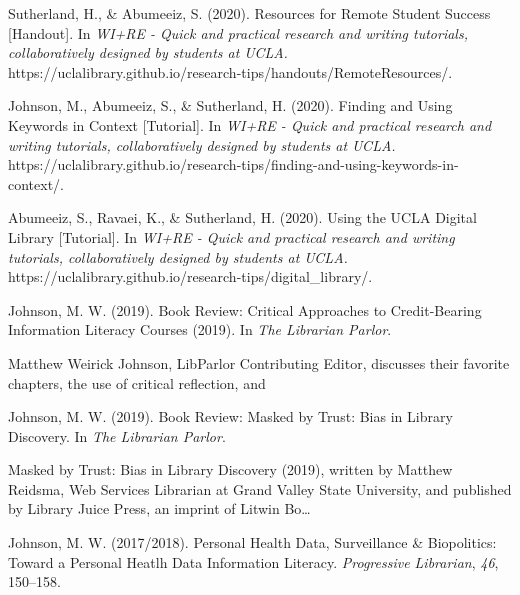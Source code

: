 \documentclass[
  letterpaper,
  DIV=11,
  numbers=noendperiod]{scrartcl}
\newlength{\cslhangindent}
\newenvironment{CSLReferences}[2] %
 {\begin{list}{}{%
  \setlength{\itemindent}{0pt}
  \setlength{\leftmargin}{0pt}
  \setlength{\parsep}{0pt}
  \ifodd #1
   \setlength{\leftmargin}{\cslhangindent}
   \setlength{\itemindent}{-1\cslhangindent}
  \fi
  \setlength{\itemsep}{#2\baselineskip}}}
 {\end{list}}
\newcommand{\CSLBlock}[1]{\hfill\break\parbox[t]{\linewidth}{\strut\ignorespaces#1\strut}}
\begin{document}
\begin{CSLReferences}{1}{0}
Sutherland, H., \& Abumeeiz, S. (2020). Resources for {Remote Student
Success} {[}Handout{]}. In \emph{WI+RE - Quick and practical research
and writing tutorials, collaboratively designed by students at UCLA.}
https://uclalibrary.github.io/research-tips/handouts/RemoteResources/.

Johnson, M., Abumeeiz, S., \& Sutherland, H. (2020). Finding and {Using
Keywords} in {Context} {[}Tutorial{]}. In \emph{WI+RE - Quick and
practical research and writing tutorials, collaboratively designed by
students at UCLA.}
https://uclalibrary.github.io/research-tips/finding-and-using-keywords-in-context/.

Abumeeiz, S., Ravaei, K., \& Sutherland, H. (2020). Using the {UCLA
Digital Library} {[}Tutorial{]}. In \emph{WI+RE - Quick and practical
research and writing tutorials, collaboratively designed by students at
UCLA.} https://uclalibrary.github.io/research-tips/digital\_library/.

Johnson, M. W. (2019). Book {Review}: {Critical Approaches} to
{Credit-Bearing Information Literacy Courses} (2019). In \emph{The
Librarian Parlor}.
\CSLBlock{Matthew Weirick Johnson, LibParlor Contributing Editor,
discusses their favorite chapters, the use of critical reflection, and}

Johnson, M. W. (2019). Book {Review}: {Masked} by {Trust}: {Bias} in
{Library Discovery}. In \emph{The Librarian Parlor}.
\CSLBlock{Masked by Trust: Bias in Library Discovery (2019), written by
Matthew Reidsma, Web Services Librarian at Grand Valley State
University, and published by Library Juice Press, an imprint of Litwin
Bo{\ldots{}}}

Johnson, M. W. (2017/2018). Personal {Health Data}, {Surveillance} \&
{Biopolitics}: {Toward} a {Personal Heatlh Data Information Literacy}.
\emph{Progressive Librarian}, \emph{46}, 150--158.

\end{CSLReferences}
\end{document}
